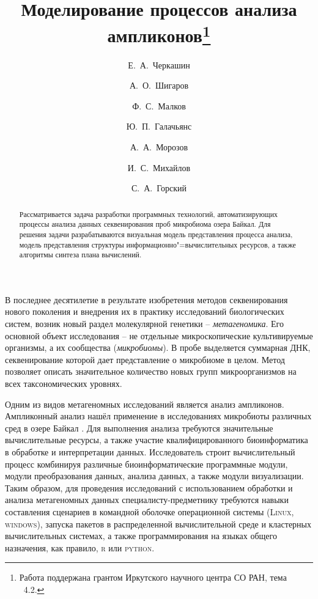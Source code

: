 \documentclass[12pt]{llncs}
\begin{document}
\title{Моделирование процессов анализа ампликонов\thanks{Работа поддержана грантом Иркутского научного центра СО РАН, тема \textnumero~4.2.}}

\author{Е.~А.~Черкашин
  \and
  А.~О.~Шигаров \and
  Ф.~С.~Малков \and
  Ю.~П.~Галачьянс \and
  А.~А.~Морозов \and
  И.~С.~Михайлов \and
  С.~А.~Горский
}


\maketitle

\begin{abstract}
  Рассматривается задача разработки программных технологий, автоматизирующих процессы анализа данных секвенирования проб микробиома озера Байкал.  Для решения задачи разрабатываются визуальная модель представления процесса анализа, модель представления структуры информационно"=вычислительных ресурсов, а также алгоритмы синтеза плана вычислений.

\end{abstract}

В последнее десятилетие в результате изобретения методов секвенирования нового поколения и внедрения их в практику исследований биологических систем, возник новый раздел молекулярной генетики -- \emph{метагеномика}. Его основной объект исследования -- не отдельные микроскопические культивируемые организмы, а их сообщества (\emph{микробиомы}).  В пробе выделяется суммарная ДНК, секвенирование которой дает представление  о микробиоме в целом.  Метод позволяет описать значительное количество новых групп микроорганизмов на всех таксономических уровнях.

Одним из видов метагеномных исследований является анализ ампликонов.  Ампликонный анализ нашёл применение в исследованиях микробиоты различных сред в озере Байкал \cite{underice}.  Для выполнения анализа требуются значительные вычислительные ресурсы, а также участие квалифицированного биоинформатика в обработке и интерпретации данных.  Исследователь строит вычислительный процесс комбинируя различные биоинформатические программные модули, модули преобразования данных, анализа данных, а также модули визуализации.  Таким образом, для проведения исследований с использованием обработки и анализа метагеномных данных специалисту-предметнику требуются навыки составления сценариев в командной оболочке операционной системы (\textsc{Linux}, \textsc{windows}), запуска пакетов в распределенной вычислительной среде и кластерных вычислительных системах, а также программирования на языках общего назначения, как правило, \textsc{r} или \textsc{python}.
\end{document}
